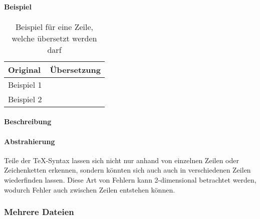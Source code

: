 \paragraph*{Beispiel}
\begin{table}[h!]
    \centering
    \begin{tabularx}{\textwidth}{X X}
        \toprule
            Original & Übersetzung\\
        \midrule
            Beispiel 1 & \\[2em]
            Beispiel 2 & \\
        \bottomrule
    \end{tabularx}
    \caption{Beispiel für eine Zeile, welche übersetzt werden darf}\label{tab:problems:dim2}
\end{table}
\paragraph*{Beschreibung}
\paragraph*{Abstrahierung}
Teile der \TeX-Syntax lassen sich nicht nur anhand von einzelnen Zeilen oder Zeichenketten erkennen, sondern könnten sich auch auch in verschiedenen Zeilen wiederfinden lassen. Diese Art von Fehlern kann 2-dimensional betrachtet werden, wodurch Fehler auch zwischen Zeilen entstehen können.

\subsubsection{Mehrere Dateien}\label{problems:dim3}
